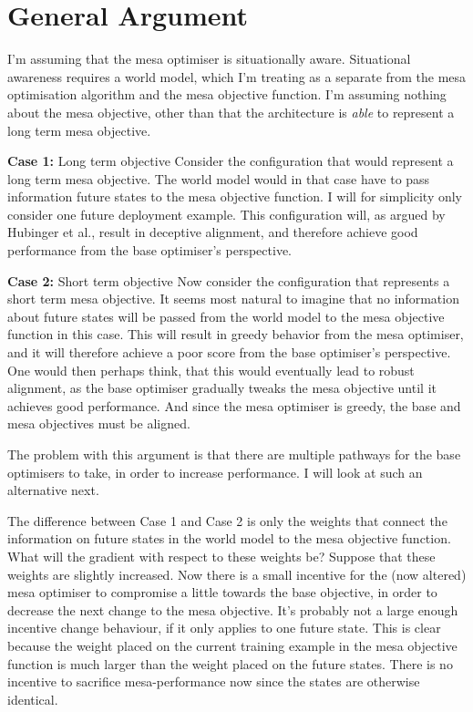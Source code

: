 \documentclass[11pt]{article}
\begin{document}
\section{General Argument}\label{sec:generalargument}
I'm assuming that the mesa optimiser is situationally aware.
Situational awareness requires a world model, which I'm treating as a separate from the mesa optimisation algorithm and
the mesa objective function.
I'm assuming nothing about the mesa objective, other than that the architecture is \emph{able} to represent a long term
mesa objective.

\textbf{Case 1:} Long term objective
Consider the configuration that would represent a long term mesa objective.
The world model would in that case have to pass information future states to the mesa objective function.
I will for simplicity only consider one future deployment example.
This configuration will, as argued by Hubinger et al.\cite{hubinger2021}, result in deceptive alignment, and therefore
achieve good performance from the base optimiser's perspective.

\textbf{Case 2:} Short term objective
Now consider the configuration that represents a short term mesa objective.
It seems most natural to imagine that no information about future states will be passed from the world model to the mesa
objective function in this case.
This will result in greedy behavior from the mesa optimiser, and it will therefore achieve a poor score from the base
optimiser's perspective.
One would then perhaps think, that this would eventually lead to robust alignment, as the base optimiser gradually
tweaks the mesa objective until it achieves good performance.
And since the mesa optimiser is greedy, the base and mesa objectives must be aligned.

The problem with this argument is that there are multiple pathways for the base optimisers to take, in order to increase
performance.
I will look at such an alternative next.

The difference between Case 1 and Case 2 is only the weights that connect the information on future states in the world
model to the mesa objective function.
What will the gradient with respect to these weights be?
Suppose that these weights are slightly increased.
Now there is a small incentive for the (now altered) mesa optimiser to compromise a little towards the base objective,
in order to decrease the next change to the mesa objective.
It's probably not a large enough incentive change behaviour, if it only applies to one future state.
This is clear because the weight placed on the current training example in the mesa objective function is much larger
than the weight placed on the future states.
There is no incentive to sacrifice mesa-performance now since the states are otherwise identical.
\end{document}
